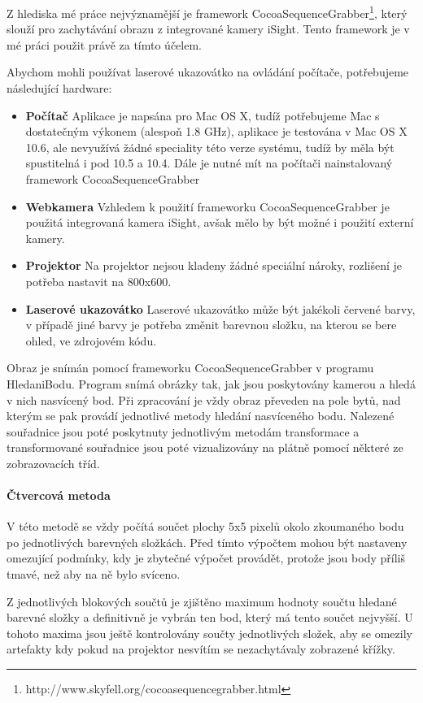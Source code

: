 \documentclass[twoside,12pt]{article}
\newcommand{\podpodsekce}[1]{\paragraph{#1}\quad\vskip 6pt}
\begin{document}
Z hlediska mé práce nejvýznamější je framework CocoaSequenceGrabber\footnote{http://www.skyfell.org/cocoasequencegrabber.html}, který slouží pro zachytávání obrazu z integrované kamery iSight. Tento framework je v mé práci použit právě za tímto účelem.

Abychom mohli používat laserové ukazovátko na ovládání počítače, potřebujeme následující hardware:
\begin{itemize}
 \item{\bf Počítač} Aplikace je napsána pro Mac OS X, tudíž potřebujeme Mac s dostatečným výkonem (alespoň 1.8 GHz), aplikace je testována v Mac OS X 10.6, ale nevyužívá žádné speciality této verze systému, tudíž by měla být spustitelná i pod 10.5 a 10.4. Dále je nutné mít na počítači nainstalovaný framework CocoaSequenceGrabber
 \item{\bf Webkamera} Vzhledem k použití frameworku CocoaSequenceGrabber je použitá integrovaná kamera iSight, avšak mělo by být možné i použití externí kamery. 
\item{\bf Projektor} Na projektor nejsou kladeny žádné speciální nároky, rozlišení je potřeba nastavit na 800x600.
\item{\bf Laserové ukazovátko} Laserové ukazovátko může být jakékoli červené barvy, v případě jiné barvy je potřeba změnit barevnou složku, na kterou se bere ohled, ve zdrojovém kódu.
\end{itemize}

Obraz je snímán pomocí frameworku CocoaSequenceGrabber v programu HledaniBodu. Program snímá obrázky tak, jak jsou poskytovány kamerou a hledá v nich nasvícený bod. Při zpracování je vždy obraz převeden na pole bytů, nad kterým se pak provádí jednotlivé metody hledání nasvíceného bodu. Nalezené souřadnice jsou poté poskytnuty jednotlivým metodám transformace a transformované souřadnice jsou poté vizualizovány na plátně pomocí některé ze zobrazovacích tříd.

\podpodsekce{Čtvercová metoda}

V této metodě se vždy počítá součet plochy 5x5 pixelů okolo zkoumaného bodu po jednotlivých barevných složkách. Před tímto výpočtem mohou být nastaveny omezující podmínky, kdy je zbytečné výpočet provádět, protože jsou body příliš tmavé, než aby na ně bylo svíceno. 

Z jednotlivých blokových součtů je zjištěno maximum hodnoty součtu hledané barevné složky a definitivně je vybrán ten bod, který má tento součet nejvyšší. U tohoto maxima jsou ještě kontrolovány součty jednotlivých složek, aby se omezily artefakty kdy pokud na projektor nesvítím se nezachytávaly zobrazené křížky.
\end{document}
